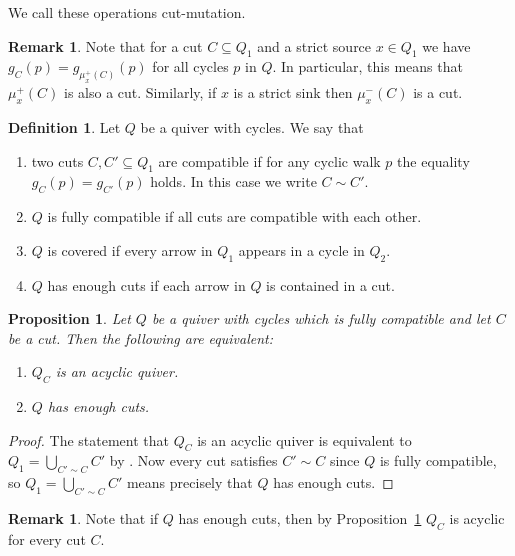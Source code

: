 \documentclass[a4paper, reqno]{amsart}
\newtheorem{myprop}[mythm]{Proposition}
\theoremstyle{definition}
\newtheorem{mydef}[mythm]{Definition}
\newtheorem{myrem}[mythm]{Remark}
\begin{document}
We call these operations cut-mutation.

\begin{myrem}
	Note that for a cut $C\subseteq Q_1$ and a strict source $x\in Q_1$ we have $g_C(p) = g_{\mu^+_x(C)}(p)$ for all cycles $p$ in $Q$. In particular, this means that $\mu^+_x(C)$ is also a cut. Similarly, if $x$ is a strict sink then $\mu^-_x(C)$ is a cut.
\end{myrem}

\begin{mydef}\cite[Definition 6.5, Definition 6.15, Definition 7.4]{HerschendOsamu2011quiverwithpotential}
	Let $Q$ be a quiver with cycles. We say that
	\begin{enumerate}
		\item two cuts $C, C'\subseteq Q_1$ are compatible if for any cyclic walk $p$ the equality $g_C(p) = g_{C'}(p)$ holds. In this case we write $C\sim C'$.
		\item $Q$ is fully compatible if all cuts are compatible with each other.
		\item $Q$ is covered if every arrow in $Q_1$ appears in a cycle in $Q_2$.
		\item $Q$ has enough cuts if each arrow in $Q$ is contained in a cut.
	\end{enumerate}
\end{mydef}

\begin{myprop}\label{proposition - Q full comp and enouch cuts}
	Let $Q$ be a quiver with cycles which is fully compatible and let $C$ be a cut. Then the following are equivalent:
	\begin{enumerate}
		\item $Q_C$ is an acyclic quiver.
		\item $Q$ has enough cuts.
	\end{enumerate}
\end{myprop}

\begin{proof}
	The statement that $Q_C$ is an acyclic quiver is equivalent to $Q_1 = \bigcup_{C'\sim C}C'$ by \cite[Proposition 6.16]{HerschendOsamu2011quiverwithpotential}. Now every cut satisfies $C'\sim C$ since $Q$ is fully compatible, so $Q_1 = \bigcup_{C'\sim C}C'$ means precisely that $Q$ has enough cuts.
\end{proof}

\begin{myrem}\label{remark - enouch cuts quiver acyclic}
	Note that if $Q$ has enough cuts, then by Proposition~\ref{proposition - Q full comp and enouch cuts} $Q_C$ is acyclic for every cut $C$.
\end{myrem}
\end{document}
